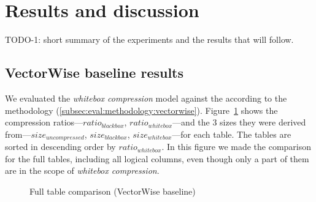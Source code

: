 \section{Results and discussion}
\label{sec:eval:resultsdiscussion}


\graphicspath{{6_evaluation/images/}}

% 

TODO-1: short summary of the experiments and the results that will follow.

\subsection{VectorWise baseline results}
\label{subsec:eval:results:vectorwise}

We evaluated the \textit{whitebox compression} model against the  according to the methodology (\ref{subsec:eval:methodology:vectorwise}). Figure~\ref{fig:eval:results:vectorwise:total} shows the compression ratios---\(ratio_{blackbox}\), \(ratio_{whitebox}\)---and the 3 sizes they were derived from---\(size_{uncompressed}\), \(size_{blackbox}\), \(size_{whitebox}\)---for each table. The tables are sorted in descending order by \(ratio_{whitebox}\). In this figure we made the comparison for the full tables, including all logical columns, even though only a part of them are in the scope of \textit{whitebox compression}.

\begin{figure}[h]
  \centering
  \caption{Full table comparison (VectorWise baseline)}
  \label{fig:eval:results:vectorwise:total}
\end{figure}

